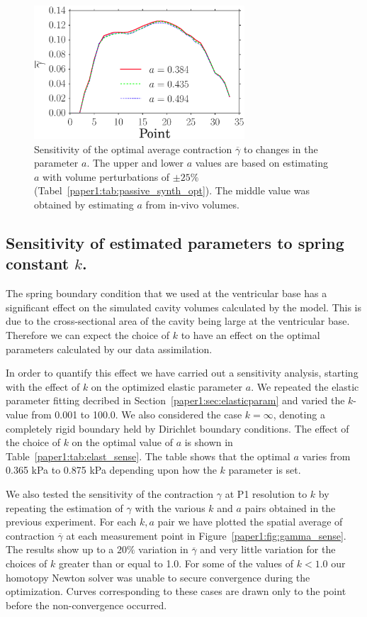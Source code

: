 \begin{figure}[t]
\includegraphics[width=0.7\textwidth]{mean_gamma_material_parameters_fixed}
\caption{Sensitivity of the optimal average contraction $\overline{\gamma}$ to changes in the parameter $a$. The upper and lower $a$
values are based on estimating $a$ with volume perturbations of $\pm 25 \% $ (Tabel~\ref{paper1:tab:passive_synth_opt}). The middle
 value was obtained by estimating $a$ from in-vivo volumes.}
\label{paper1:fig:gamma_sense_mat}
\end{figure}


\subsection{Sensitivity of estimated parameters to spring constant $k$.}
\label{paper1:sec:k_sense}
The spring boundary condition that we used at the ventricular base has a significant
effect on the simulated cavity volumes calculated by the model. This is due to the 
cross-sectional area of the cavity being large at the ventricular base. Therefore 
we can expect the choice of $k$ to have an effect on the optimal parameters calculated 
by our data assimilation. 

In order to quantify this effect we have
carried out a sensitivity analysis, starting with the effect of $k$ on the optimized elastic parameter $a$.
We repeated the elastic parameter fitting decribed in Section~\ref{paper1:sec:elasticparam} and varied the $k$-value from 0.001 to 100.0.
We also considered the case $k = \infty$, denoting a completely rigid boundary held by
Dirichlet boundary conditions. The effect of the choice of $k$ on the
optimal value of $a$ is shown in Table~\ref{paper1:tab:elast_sense}. The
table shows that the optimal $a$ varies from 0.365 kPa to 0.875 kPa depending upon how the $k$ parameter is set. 

We also tested the sensitivity of the contraction $\gamma$ at P1 resolution to $k$ by
repeating the estimation of $\gamma$ with the various $k$ and $a$ pairs obtained in the
previous experiment. For each $k, a$ pair we have plotted the spatial average of contraction $\overline{\gamma}$
at each measurement point in Figure~\ref{paper1:fig:gamma_sense}. The results
show up to a $20 \%$ variation in $\overline{\gamma}$ and
very little variation for the choices of $k$ greater than or equal to
1.0. For some of the values of $k < 1.0$ our homotopy Newton solver was unable to 
secure convergence during the optimization. Curves corresponding to
these cases are drawn only to the point before the non-convergence occurred.


